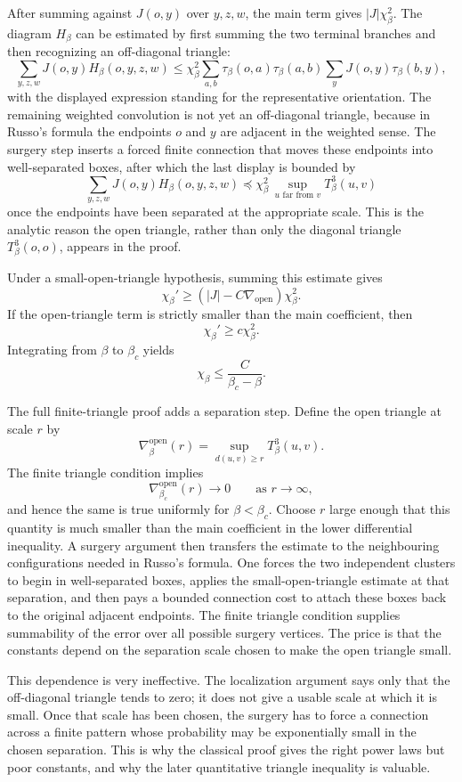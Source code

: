 \documentclass[11pt,reqno]{book}
\numberwithin{equation}{chapter}
\theoremstyle{plain}
\theoremstyle{definition}
\theoremstyle{remark}
\newcommand{\1}{\mathbf 1}
\newcommand{\pre}{\preceq}
\begin{document}
After summing against $J(o,y)$ over $y,z,w$, the main term gives $|J|\chi_\beta^2$. The diagram $H_\beta$ can be estimated by first summing the two terminal branches and then recognizing an off-diagonal triangle:
\[
  \sum_{y,z,w}J(o,y)H_\beta(o,y,z,w)
  \leq
  \chi_\beta^2
  \sum_{a,b}
  \tau_\beta(o,a)\tau_\beta(a,b)
  \sum_y J(o,y)\tau_\beta(b,y),
\]
with the displayed expression standing for the representative orientation. The remaining weighted convolution is not yet an off-diagonal triangle, because in Russo's formula the endpoints \(o\) and \(y\) are adjacent in the weighted sense. The surgery step inserts a forced finite connection that moves these endpoints into well-separated boxes, after which the last display is bounded by
\[
  \sum_{y,z,w}J(o,y)H_\beta(o,y,z,w)
  \pre
  \chi_\beta^2\,
  \sup_{u\text{ far from }v}T_\beta^3(u,v)
\]
once the endpoints have been separated at the appropriate scale. This is the analytic reason the open triangle, rather than only the diagonal triangle $T_\beta^3(o,o)$, appears in the proof.

Under a small-open-triangle hypothesis, summing this estimate gives
\[
  \chi_\beta'\geq (|J|-C\nabla_{\mathrm{open}})\chi_\beta^2.
\]
If the open-triangle term is strictly smaller than the main coefficient, then
\[
  \chi_\beta'\geq c\chi_\beta^2.
\]
Integrating from $\beta$ to $\beta_c$ yields
\[
  \chi_\beta\leq \frac{C}{\beta_c-\beta}.
\]

The full finite-triangle proof adds a separation step. Define the open
triangle at scale \(r\) by
\[
  \nabla_\beta^{\mathrm{open}}(r)
  =
  \sup_{d(u,v)\geq r}T_\beta^3(u,v).
\]
The finite triangle condition implies
\[
  \nabla_{\beta_c}^{\mathrm{open}}(r)\longrightarrow0
  \qquad\text{as }r\to\infty,
\]
and hence the same is true uniformly for \(\beta<\beta_c\). Choose \(r\)
large enough that this quantity is much smaller than the main coefficient in
the lower differential inequality. A surgery argument then transfers the
estimate to the neighbouring configurations needed in Russo's formula. One
forces the two independent clusters to begin in well-separated boxes, applies
the small-open-triangle estimate at that separation, and then pays a bounded
connection cost to attach these boxes back to the original adjacent endpoints.
The finite triangle condition supplies summability of the error over all
possible surgery vertices. The price is that the constants depend on the
separation scale chosen to make the open triangle small.

This dependence is very ineffective. The localization argument says only that the off-diagonal triangle tends to zero; it does not give a usable scale at which it is small. Once that scale has been chosen, the surgery has to force a connection across a finite pattern whose probability may be exponentially small in the chosen separation. This is why the classical proof gives the right power laws but poor constants, and why the later quantitative triangle inequality is valuable.
\end{document}
